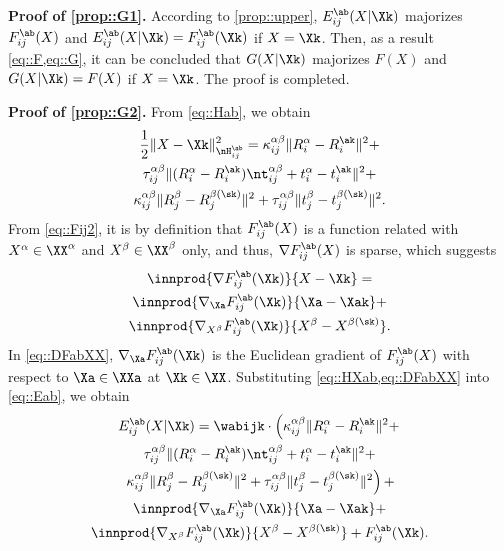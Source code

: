 \noindent\textbf{Proof of \ref{prop::G1}.\;} 
According to \cref{prop::upper}, $E_{ij}^{\ab}(X|\Xk)$ majorizes $F_{ij}^{\ab}(X)$ and $E_{ij}^{\ab}(X|\Xk)=F_{ij}^{\ab}(\Xk)$ if $X=\Xk$. Then, as a result \cref{eq::F,eq::G}, it can be concluded that $G(X|\Xk)$ majorizes $F(X)$ and $G(X|\Xk)=F(X)$ if $X=\Xk$. The proof is completed.
\vspace{1em}

\noindent\textbf{Proof of \ref{prop::G2}.\;}
From \cref{eq::Hab}, we obtain
\vspace{-0.3em}
\begin{multline}\label{eq::HXab}
\frac{1}{2}\|X-\Xk\|_{\nH_{ij}^{\ab}}^2=\kappa_{ij}^{\alpha\beta}\|R_i^\alpha-R_i^{\ak}\|^2+\\
\tau_{ij}^{\alpha\beta}\|(R_i^\alpha - R_i^{\ak})\nt_{ij}^{\alpha\beta}+t_i^\alpha-t_i^{\ak}\|^2+\\
\kappa_{ij}^{\alpha\beta}\|R_j^\beta-R_j^{\beta(\sk)}\|^2+\tau_{ij}^{\alpha\beta}\|t_j^\beta-t_j^{\beta(\sk)}\|^2.
\end{multline}
From \cref{eq::Fij2}, it is by definition that $F_{ij}^{\ab}(X)$  is a function related with $X^\alpha\in \XX^\alpha$ and $X^\beta\in\XX^\beta$ only, and thus, $\nabla F_{ij}^{\ab}(X)$ is sparse, which suggests
\vspace{-0.3em}
\begin{multline}\label{eq::DFabXX}
\innprod{\nabla F_{ij}^{\ab}(\Xk)}{X-\Xk}=\\
\innprod{\nabla_{\Xa} F_{ij}^{\ab}(\Xk)}{\Xa-\Xak}+\\
\innprod{\nabla_{X^{\beta}} F_{ij}^{\ab}(\Xk)}{X^{\beta}-X^{\beta(\sk)}}.
\end{multline}
In \cref{eq::DFabXX}, $\nabla_{\Xa} F_{ij}^{\ab}(\Xk)$ is the Euclidean gradient of $F_{ij}^{\ab}(X)$ with respect to $\Xa\in\XXa$ at $\Xk\in\XX$.  Substituting \cref{eq::HXab,eq::DFabXX} into \cref{eq::Eab}, we obtain
\vspace{-0.3em}
\begin{multline}\label{eq::Eij3}
E_{ij}^{\ab}(X|\Xk)=\wabijk\cdot\left(\kappa_{ij}^{\alpha\beta}\|R_i^\alpha-R_i^{\ak}\|^2+\right.\\
\tau_{ij}^{\alpha\beta}\|(R_i^\alpha - R_i^{\ak})\nt_{ij}^{\alpha\beta}+t_i^\alpha-t_i^{\ak}\|^2+\\
\left.\kappa_{ij}^{\alpha\beta}\|R_j^\beta-R_j^{\beta(\sk)}\|^2+\tau_{ij}^{\alpha\beta}\|t_j^\beta-t_j^{\beta(\sk)}\|^2\right)+\\
\innprod{\nabla_{\Xa} F_{ij}^{\ab}(\Xk)}{\Xa-\Xak}+\\
\innprod{\nabla_{X^{\beta}} F_{ij}^{\ab}(\Xk)}{X^{\beta}-X^{\beta(\sk)}}+F_{ij}^{\ab}(\Xk).
\end{multline}
